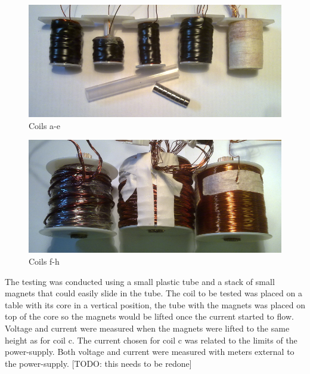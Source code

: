 \documentclass[]{elementary-physics}
\begin{document}
\begin{figure}[ht] \centering
	\includegraphics[scale=1.7]{coils-a-e} \caption{Coils a-e}
\end{figure}

\begin{figure}[ht] \centering
	\includegraphics[scale=1.7]{coils-f-h} \caption{Coils f-h}
\end{figure}

The testing was conducted using a small plastic tube and a stack of small magnets that could easily slide in the tube.
The coil to be tested was placed on a table with its core in a vertical position, the tube with the magnets was placed on top of the core so the magnets would be lifted once the current started to flow.
Voltage and current were measured when the magnets were lifted to the same height as for coil c.
The current chosen for coil c was related to the limits of the power-supply.
Both voltage and current were measured with meters external to the power-supply.
[TODO: this needs to be redone]
\end{document}
